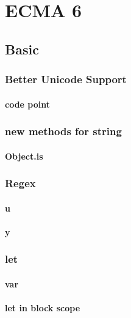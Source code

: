 \chapter{ECMA 6}

\section{Basic}

\subsection{Better Unicode Support}

\subsubsection{code point}

\subsection{new methods for string}

\subsubsection{Object.is}

\subsection{Regex}

\subsubsection{u}

\subsubsection{y}

\subsection{let}

\subsubsection{var}

\subsubsection{let in block scope}

